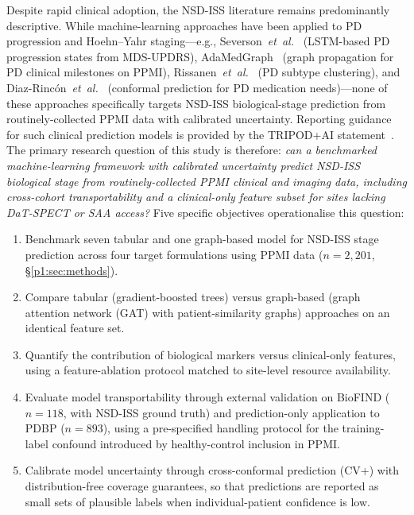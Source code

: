 Despite rapid clinical adoption, the NSD-ISS literature remains predominantly descriptive. While machine-learning approaches have been applied to PD progression and Hoehn--Yahr staging---e.g., Severson~\textit{et~al.}~\cite{severson2021nm} (LSTM-based PD progression states from MDS-UPDRS), AdaMedGraph~\cite{adamedgraph} (graph propagation for PD clinical milestones on PPMI), Rissanen~\textit{et~al.}~\cite{rissanen2022} (PD subtype clustering), and Diaz-Rinc\'{o}n~\textit{et~al.}~\cite{diazrincon2025} (conformal prediction for PD medication needs)---none of these approaches specifically targets NSD-ISS biological-stage prediction from routinely-collected PPMI data with calibrated uncertainty. Reporting guidance for such clinical prediction models is provided by the TRIPOD+AI statement~\cite{collins2024}. The primary research question of this study is therefore: \emph{can a benchmarked machine-learning framework with calibrated uncertainty predict NSD-ISS biological stage from routinely-collected PPMI clinical and imaging data, including cross-cohort transportability and a clinical-only feature subset for sites lacking DaT-SPECT or SAA access?} Five specific objectives operationalise this question:

\begin{enumerate}
    \item Benchmark seven tabular and one graph-based model for NSD-ISS stage prediction across four target formulations using PPMI data ($n{=}2{,}201$, \S\ref{p1:sec:methods}).
    \item Compare tabular (gradient-boosted trees) versus graph-based (graph attention network (GAT) with patient-similarity graphs) approaches on an identical feature set.
    \item Quantify the contribution of biological markers versus clinical-only features, using a feature-ablation protocol matched to site-level resource availability.
    \item Evaluate model transportability through external validation on BioFIND ($n{=}118$, with NSD-ISS ground truth) and prediction-only application to PDBP ($n{=}893$), using a pre-specified handling protocol for the training-label confound introduced by healthy-control inclusion in PPMI.
    \item Calibrate model uncertainty through cross-conformal prediction (CV+) with distribution-free coverage guarantees, so that predictions are reported as small sets of plausible labels when individual-patient confidence is low.
\end{enumerate}

